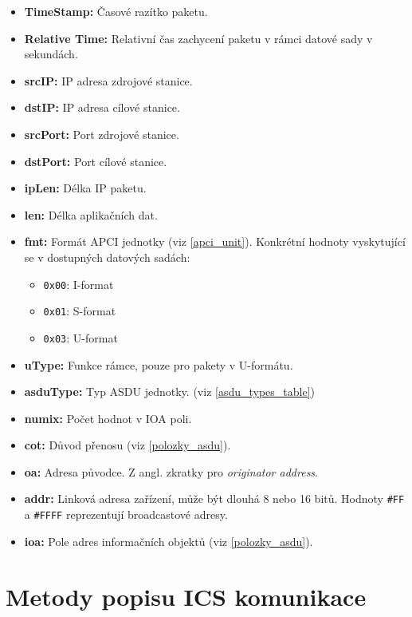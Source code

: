 \begin{itemize}
    \item \textbf{TimeStamp:} Časové razítko paketu.
    \item \textbf{Relative Time:} Relativní čas zachycení paketu v rámci datové sady v sekundách.
    \item \textbf{srcIP:} IP adresa zdrojové stanice.
    \item \textbf{dstIP:} IP adresa cílové stanice.
    \item \textbf{srcPort:} Port zdrojové stanice.
    \item \textbf{dstPort:} Port cílové stanice.
    \item \textbf{ipLen:} Délka IP paketu.
    \item \textbf{len:} Délka aplikačních dat.
    \item \textbf{fmt:} Formát APCI jednotky (viz \ref{apci_unit}). Konkrétní hodnoty vyskytující se v dostupných datových sadách:
    \begin{itemize}
        \item \texttt{0x00}: I-format
        \item \texttt{0x01}: S-format
        \item \texttt{0x03}: U-format
    \end{itemize}
    \item \textbf{uType:} Funkce rámce, pouze pro pakety v U-formátu.
    \item \textbf{asduType:} Typ ASDU jednotky. (viz \ref{asdu_types_table})
    \item \textbf{numix:} Počet hodnot v IOA poli.
    \item \textbf{cot:} Důvod přenosu (viz \ref{polozky_asdu}).
    \item \textbf{oa:} Adresa původce. Z angl. zkratky pro \emph{originator address}.
    \item \textbf{addr:} Linková adresa zařízení, může být dlouhá 8 nebo 16 bitů. Hodnoty \texttt{\#FF} a \texttt{\#FFFF} reprezentují broadcastové adresy.
    \item \textbf{ioa:} Pole adres informačních objektů (viz \ref{polozky_asdu}).
\end{itemize}


\label{polozky_datovych_sad}






\section{Metody popisu ICS komunikace}
\label{methods}

